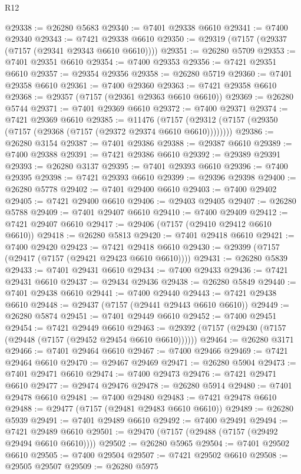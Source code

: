 \begin{lexlean}{R12}
\begin{coremodule}
@29338 := @26280 @5683
@29340 := @7401 @29338 @6610
@29341 := @7400 @29340
@29343 := @7421 @29338 @6610
@29350 := @29319 (@7157 (@29337 (@7157 (@29341 @29343 @6610 @6610))))
@29351 := @26280 @5709
@29353 := @7401 @29351 @6610
@29354 := @7400 @29353
@29356 := @7421 @29351 @6610
@29357 := @29354 @29356
@29358 := @26280 @5719
@29360 := @7401 @29358 @6610
@29361 := @7400 @29360
@29363 := @7421 @29358 @6610
@29368 := @29357 (@7157 (@29361 @29363 @6610 @6610))
@29369 := @26280 @5744
@29371 := @7401 @29369 @6610
@29372 := @7400 @29371
@29374 := @7421 @29369 @6610
@29385 := @11476
    (@7157 (@29312 (@7157 (@29350 (@7157 (@29368 (@7157 (@29372 @29374 @6610 @6610))))))))
@29386 := @26280 @3154
@29387 := @7401 @29386
@29388 := @29387 @6610
@29389 := @7400 @29388
@29391 := @7421 @29386 @6610
@29392 := @29389 @29391
@29393 := @26280 @3137
@29395 := @7401 @29393 @6610
@29396 := @7400 @29395
@29398 := @7421 @29393 @6610
@29399 := @29396 @29398
@29400 := @26280 @5778
@29402 := @7401 @29400 @6610
@29403 := @7400 @29402
@29405 := @7421 @29400 @6610
@29406 := @29403 @29405
@29407 := @26280 @5788
@29409 := @7401 @29407 @6610
@29410 := @7400 @29409
@29412 := @7421 @29407 @6610
@29417 := @29406 (@7157 (@29410 @29412 @6610 @6610))
@29418 := @26280 @5813
@29420 := @7401 @29418 @6610
@29421 := @7400 @29420
@29423 := @7421 @29418 @6610
@29430 := @29399 (@7157 (@29417 (@7157 (@29421 @29423 @6610 @6610))))
@29431 := @26280 @5839
@29433 := @7401 @29431 @6610
@29434 := @7400 @29433
@29436 := @7421 @29431 @6610
@29437 := @29434 @29436
@29438 := @26280 @5849
@29440 := @7401 @29438 @6610
@29441 := @7400 @29440
@29443 := @7421 @29438 @6610
@29448 := @29437 (@7157 (@29441 @29443 @6610 @6610))
@29449 := @26280 @5874
@29451 := @7401 @29449 @6610
@29452 := @7400 @29451
@29454 := @7421 @29449 @6610
@29463 := @29392 (@7157 (@29430 (@7157 (@29448 (@7157 (@29452 @29454 @6610 @6610))))))
@29464 := @26280 @3171
@29466 := @7401 @29464 @6610
@29467 := @7400 @29466
@29469 := @7421 @29464 @6610
@29470 := @29467 @29469
@29471 := @26280 @5904
@29473 := @7401 @29471 @6610
@29474 := @7400 @29473
@29476 := @7421 @29471 @6610
@29477 := @29474 @29476
@29478 := @26280 @5914
@29480 := @7401 @29478 @6610
@29481 := @7400 @29480
@29483 := @7421 @29478 @6610
@29488 := @29477 (@7157 (@29481 @29483 @6610 @6610))
@29489 := @26280 @5939
@29491 := @7401 @29489 @6610
@29492 := @7400 @29491
@29494 := @7421 @29489 @6610
@29501 := @29470 (@7157 (@29488 (@7157 (@29492 @29494 @6610 @6610))))
@29502 := @26280 @5965
@29504 := @7401 @29502 @6610
@29505 := @7400 @29504
@29507 := @7421 @29502 @6610
@29508 := @29505 @29507
@29509 := @26280 @5975

\end{coremodule}
\end{lexlean}

